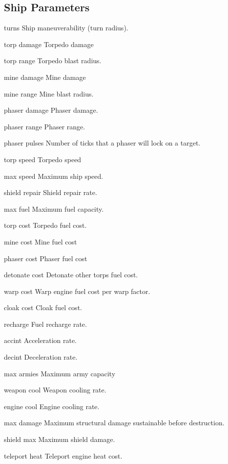 \subsection{Ship Parameters}
\begin{list}{}{
	\renewcommand{\makelabel}[1]{{\tt #1 \hfill}}
         \setlength{\leftmargin}{2.5cm}
         \setlength{\labelwidth}{\leftmargin}
         \setlength{\labelsep}{0in}
         \setlength{\itemsep}{.2em}
}
\item[turns]   Ship maneuverability (turn radius).
\item[torp damage]  Torpedo damage
\item[torp range]  Torpedo blast radius.
\item[mine damage] Mine damage
\item[mine range]  Mine blast radius.
\item[phaser damage] Phaser damage.
\item[phaser range] Phaser range.
\item[phaser pulses]  Number of ticks that a phaser will lock on a target.
\item[torp speed]  Torpedo speed
\item[max speed] Maximum ship speed.
\item[shield repair]  Shield repair rate.
\item[max fuel]  Maximum fuel capacity.
\item[torp cost] Torpedo fuel cost.  
\item[mine cost] Mine fuel cost 
\item[phaser cost] Phaser fuel cost
\item[detonate cost] Detonate other torps fuel cost.
\item[warp cost] Warp engine fuel cost per warp factor.
\item[cloak cost] Cloak fuel cost.
\item[recharge]  Fuel recharge rate.
\item[accint]  Acceleration rate.
\item[decint]  Deceleration rate.
\item[max armies]  Maximum army capacity
\item[weapon cool]  Weapon cooling rate.
\item[engine cool]  Engine cooling rate.
\item[max damage] Maximum structural damage sustainable before destruction.
\item[shield max]  Maximum shield damage. 
\item[teleport heat]  Teleport engine heat cost.

\end{list}
